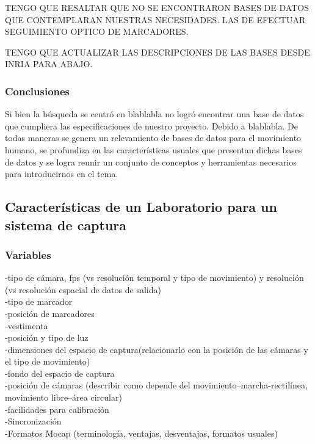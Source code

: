 TENGO QUE RESALTAR QUE NO SE ENCONTRARON BASES DE DATOS QUE CONTEMPLARAN NUESTRAS NECESIDADES. LAS DE EFECTUAR SEGUIMIENTO OPTICO DE MARCADORES.

TENGO QUE ACTUALIZAR LAS DESCRIPCIONES DE LAS BASES DESDE INRIA PARA ABAJO.
\subsubsection{Conclusiones}
Si bien la búsqueda se centró en blablabla no logró encontrar una base de datos que cumpliera las especificaciones de nuestro proyecto. Debido a blablabla.
 De todas maneras se genera un relevamiento de bases de datos para el movimiento humano, se profundiza en las características usuales que presentan dichas bases de datos y se logra reunir un conjunto de conceptos y herramientas necesarios para introducirnos en el tema. 



\subsection{Características de un Laboratorio para un sistema de captura}
\subsubsection{Variables}
-tipo de cámara, fps (vs resolución temporal y tipo de movimiento)  y resolución (vs resolución espacial de datos de salida)\\
-tipo de marcador\\
-posición de marcadores\\
-vestimenta\\
-posición y tipo de luz\\
-dimensiones del espacio de captura(relacionarlo con la posición de las cámaras y el tipo de movimiento)\\
-fondo del espacio de captura\\
-posición de cámaras (describir como depende del movimiento--marcha-rectilínea, movimiento libre--área circular)\\
-facilidades para calibración\\
-Sincronización\\
-Formatos Mocap (terminología, ventajas, desventajas, formatos usuales)
\\


